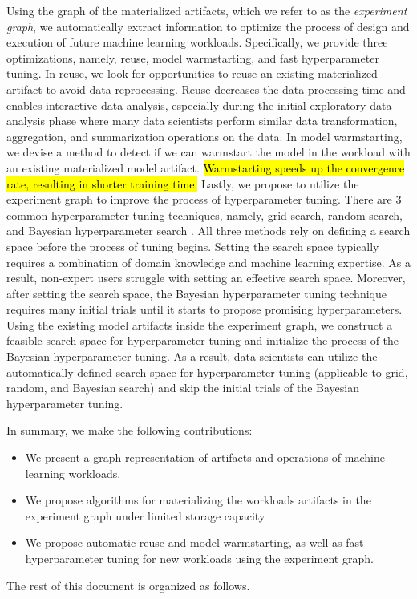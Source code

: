 Using the graph of the materialized artifacts, which we refer to as the \textit{experiment graph}, we automatically extract information to optimize the process of design and execution of future machine learning workloads.
Specifically, we provide three optimizations, namely, reuse, model warmstarting, and fast hyperparameter tuning.
In reuse, we look for opportunities to reuse an existing materialized artifact to avoid data reprocessing.
Reuse decreases the data processing time and enables interactive data analysis, especially during the initial exploratory data analysis phase where many data scientists perform similar data transformation, aggregation, and summarization operations on the data.
In model warmstarting, we devise a method to detect if we can warmstart the model in the workload with an existing materialized model artifact.
\hl{Warmstarting speeds up the convergence rate, resulting in shorter training time.}  %
Lastly, we propose to utilize the experiment graph to improve the process of hyperparameter tuning.
There are 3 common hyperparameter tuning techniques, namely, grid search, random search, and Bayesian hyperparameter search \cite{hutter2011sequential,snoek2012practical}.
All three methods rely on defining a search space before the process of tuning begins.
Setting the search space typically requires a combination of domain knowledge and machine learning expertise.
As a result, non-expert users struggle with setting an effective search space.
Moreover, after setting the search space, the Bayesian hyperparameter tuning technique requires many initial trials until it starts to propose promising hyperparameters.
Using the existing model artifacts inside the experiment graph, we construct a feasible search space for hyperparameter tuning and initialize the process of the Bayesian hyperparameter tuning.
As a result, data scientists can utilize the automatically defined search space for hyperparameter tuning (applicable to grid, random, and Bayesian search) and skip the initial trials of the Bayesian hyperparameter tuning.

In summary, we make the following contributions:
\begin{itemize}
\item We present a graph representation of artifacts and operations of machine learning workloads.
\item We propose algorithms for materializing the workloads artifacts in the experiment graph under limited storage capacity
\item We propose automatic reuse and model warmstarting, as well as fast hyperparameter tuning for new workloads using the experiment graph.
\end{itemize}

The rest of this document is organized as follows.